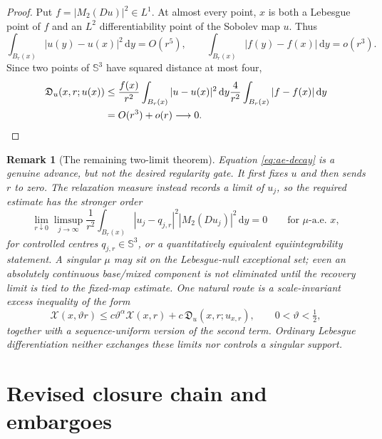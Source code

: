 \documentclass[11pt]{article}
\newtheorem{remark}[theorem]{Remark}
\newcommand{\dd}{\,\mathrm d}
\newcommand{\SSS}{\mathbb S}
\newcommand{\cX}{\mathcal X}
\begin{document}
\begin{proof}
Put $f=|M_2(Du)|^2\in L^1$.  At almost every point, $x$ is both a Lebesgue
point of $f$ and an $L^2$ differentiability point of the Sobolev map $u$.
Thus
\begin{equation}
 \int_{B_r(x)}|u(y)-u(x)|^2\dd y=O(r^5),\qquad
 \int_{B_r(x)}|f(y)-f(x)|\dd y=o(r^3).
 \label{eq:leb-points}
\end{equation}
Since two points of $\SSS^3$ have squared distance at most four,
\begin{align}
 \mathfrak D_u(x,r;u(x))
 &\leq\frac{f(x)}{r^2}
 \int_{B_r(x)}|u-u(x)|^2\dd y
 \frac4{r^2}\int_{B_r(x)}|f-f(x)|\dd y\notag\\
 &=O(r^3)+o(r)\longrightarrow0.                       \label{eq:ae-proof}
\end{align}
\end{proof}

\begin{remark}[The remaining two-limit theorem]
Equation \eqref{eq:ae-decay} is a genuine advance, but not the desired
regularity gate.  It first fixes $u$ and then sends $r$ to zero.  The
relaxation measure instead records a limit of $u_j$, so the required estimate
has the stronger order
\begin{equation}
 \lim_{r\downarrow0}\limsup_{j\to\infty}
 \frac1{r^2}\int_{B_r(x)}|u_j-q_{j,r}|^2
 |M_2(Du_j)|^2\dd y=0
 \qquad\text{for $\mu$-a.e.\ }x,                    \label{eq:two-limit}
\end{equation}
for controlled centres $q_{j,r}\in\SSS^3$, or a quantitatively equivalent
equiintegrability statement.  A singular $\mu$ may sit on the Lebesgue-null
exceptional set; even an absolutely continuous base/mixed component is not
eliminated until the recovery limit is tied to the fixed-map estimate.
One natural route is a scale-invariant excess inequality of the form
\begin{equation}
 \cX(x,\vartheta r)\leq c\vartheta^\alpha\cX(x,r)
 +c\,\mathfrak D_u(x,r;u_{x,r}),
 \qquad 0<\vartheta<\tfrac12,
 \label{eq:excess}
\end{equation}
together with a sequence-uniform version of the second term.  Ordinary
Lebesgue differentiation neither exchanges these limits nor controls a
singular support.
\end{remark}

\section{Revised closure chain and embargoes}
\end{document}
